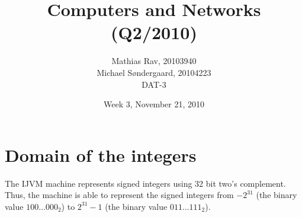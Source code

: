 \documentclass[12pt,a4paper]{article}
\title{Computers and Networks (Q2/2010)}
\author{Mathias Rav, 20103940 \\
		Michael Søndergaard, 20104223 \\
		DAT-3}
\date{Week 3, November 21, 2010}
\begin{document}
\maketitle
\section{Domain of the integers}
The IJVM machine represents signed integers using 32 bit two's complement.
Thus, the machine is able to represent the signed integers from $-2^{31}$ (the
binary value $100\dots000_2$) to $2^{31}-1$ (the binary value $011\dots111_2$).
\end{document}
